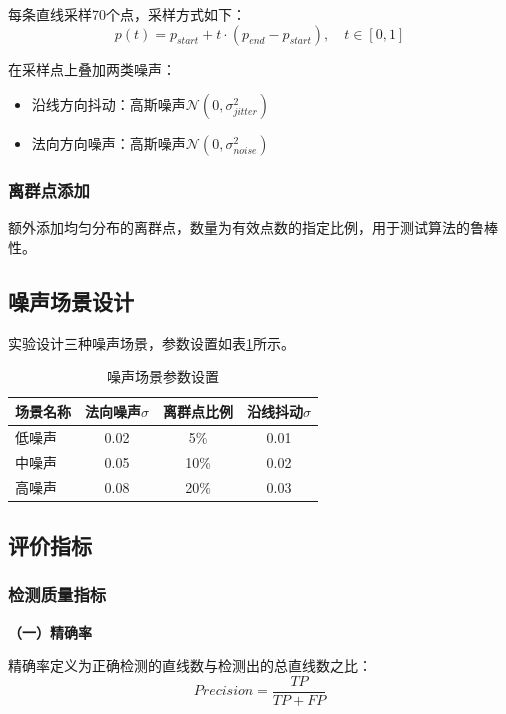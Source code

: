\documentclass[12pt,a4paper]{article}
\begin{document}
每条直线采样70个点，采样方式如下：
\begin{equation}
    p(t) = p_{start} + t \cdot (p_{end} - p_{start}), \quad t \in [0, 1]
\end{equation}

在采样点上叠加两类噪声：
\begin{itemize}[itemsep=0pt]
    \item 沿线方向抖动：高斯噪声$\mathcal{N}(0, \sigma_{jitter}^2)$
    \item 法向方向噪声：高斯噪声$\mathcal{N}(0, \sigma_{noise}^2)$
\end{itemize}

\subsubsection{离群点添加}

额外添加均匀分布的离群点，数量为有效点数的指定比例，用于测试算法的鲁棒性。

\subsection{噪声场景设计}

实验设计三种噪声场景，参数设置如表\ref{tab:noise_params}所示。

\begin{table}[H]
\centering
\caption{噪声场景参数设置}
\label{tab:noise_params}
\begin{tabular}{lccc}
\toprule
场景名称 & 法向噪声$\sigma$ & 离群点比例 & 沿线抖动$\sigma$ \\
\midrule
低噪声 & 0.02 & 5\% & 0.01 \\
中噪声 & 0.05 & 10\% & 0.02 \\
高噪声 & 0.08 & 20\% & 0.03 \\
\bottomrule
\end{tabular}
\end{table}

\subsection{评价指标}

\subsubsection{检测质量指标}

\textbf{（一）精确率}

精确率定义为正确检测的直线数与检测出的总直线数之比：
\begin{equation}
    Precision = \frac{TP}{TP + FP}
\end{equation}
\end{document}
